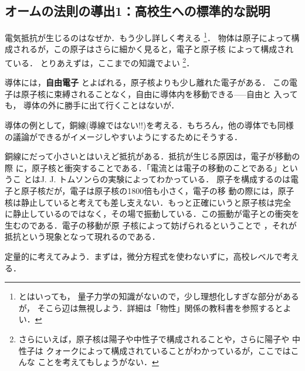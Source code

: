        \subsection{オームの法則の導出1：高校生への標準的な説明}
            電気抵抗が生じるのはなぜか．もう少し詳しく考える
                \footnote{
                    とはいっても，
                    量子力学の知識がないので，少し理想化しすぎな部分があるが，
                    そこら辺は無視しよう．詳細は「物性」関係の教科書を参照するとよい．
                }．
            物体は原子によって構成されるが，この原子はさらに細かく見ると，電子と原子核
            によって構成されている．
            とりあえずは，ここまでの知識でよい
                \footnote{
                    さらにいえば，原子核は陽子や中性子で構成されることや，さらに陽子や
                    中性子は
                    クォークによって構成されていることがわかっているが，ここではこんな
                    ことを考えてもしょうがない．
                }．

            導体には，\textbf{自由電子} とよばれる，原子核よりも少し離れた電子がある．
            この電子は原子核に束縛されることなく，自由に導体内を移動できる-----自由と
            入っても，
            導体の外に勝手に出て行くことはないが．

            導体の例として，銅線(導線ではない!!)を考える．もちろん，他の導体でも同様
            の議論ができるがイメージしやすいようにするためにそうする．

            銅線にだって小さいとはいえど抵抗がある．抵抗が生じる原因は，電子が移動の際
            に，原子核と衝突することである．「電流とは電子の移動のことである」というこ
            とはJ. J. トムソンらの実験によってわかっている．
            原子を構成するのは電子と原子核だが，電子は原子核の1800倍も小さく，電子の移
            動の際には，原子核は静止していると考えても差し支えない．もっと正確にいうと原子核は完全
            に静止しているのではなく，その場で振動している．この振動が電子との衝突を生むのである．電子の移動が原
            子核によって妨げられるということで
            ，それが抵抗という現象となって現れるのである．

            定量的に考えてみよう．まずは，微分方程式を使わないずに，高校レベルで考える．

